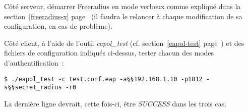 Côté serveur, démarrer Freeradius en mode verbeux comme expliqué dans la section~\ref{freeradius-x} page~\pageref{freeradius-x} (il faudra le relancer à chaque modification de sa configuration, en cas de problème).

Côté client, à l'aide de l'outil \emph{eapol\_test} (cf. section~\ref{eapol-test} page~\pageref{eapol-test}) et des fichiers de configuration indiqués ci-dessus, tester chacun des modes d'authentification~:

\begin{lstlisting}
$ ./eapol_test -c test.conf.eap -a§§192.168.1.10 -p1812 -s§§secret_radius -r0
\end{lstlisting}

La dernière ligne devrait, cette fois-ci, être \emph{SUCCESS} dans les trois cas.
